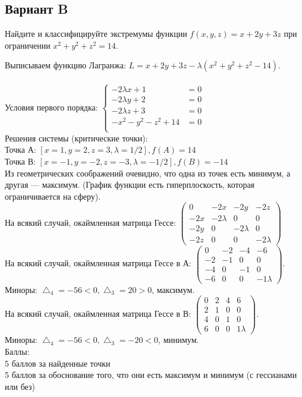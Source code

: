 \documentclass[addpoints, answers]{exam} %
\begin{document}
\subsection{Вариант B}
\begin{questions}
\question[10] Найдите и классифицируйте экстремумы функции $f(x,y,z)=x+2y+3z$ при ограничении $x^2+y^2+z^2=14$.\\

   \begin{solution}
Выписываем функцию Лагранжа: $L=x+2y+3z-\lambda (x^2+y^2+z^2-14)$.\\\\
Условия первого порядка:
$\left\{\begin{aligned}
-2\lambda x+1&=0\\
-2\lambda y+2&=0\\
-2\lambda z+3&=0\\
-x^2-y^2-z^2+14&=0\\
\end{aligned}\right.$\\
Решения системы (критические точки): \\
Точка А: $\left[ x=1,y=2,z=3,\lambda=1/2\right], f(A)=14$\\
Точка В: $\left[ x=-1,y=-2,z=-3,\lambda=-1/2\right], f(B)=-14$\\
Из геометрических соображений очевидно, что одна из точек есть минимум, а другая --- максимум. (График функции есть гиперплоскость, которая ограничивается на сферу).\\
На всякий случай, окаймленная матрица Гессе:
$\left(\begin{array}{cccc}
0 & -2x & -2y & -2z\\
-2x & -2\lambda & 0 & 0\\
-2y & 0 & -2\lambda & 0\\
-2z & 0 & 0 & -2\lambda
\end{array}\right)$\\
На всякий случай, окаймленная матрица Гессе в А:
$\left(\begin{array}{cccc}
0 & -2 & -4 & -6\\
-2 & -1 & 0 & 0\\
-4 & 0 & -1 & 0\\
-6 & 0 & 0 & -1\lambda
\end{array}\right)$.\\
Миноры: $\bigtriangleup_4=-56<0, \bigtriangleup_3=20>0$, максимум.\\
На всякий случай, окаймленная матрица Гессе в В:
$\left(\begin{array}{cccc}
0 & 2 & 4 & 6\\
2 & 1 & 0 & 0\\
4 & 0 & 1 & 0\\
6 & 0 & 0 & 1\lambda
\end{array}\right)$.\\
Миноры: $\bigtriangleup_4=-56<0, \bigtriangleup_3=-20<0$, минимум.\\
Баллы:\\
5 баллов за найденные точки\\
5 баллов за обоснование того, что они есть максимум и минимум (с гессианами или без)
   \end{solution}


\end{questions}
\end{document}
